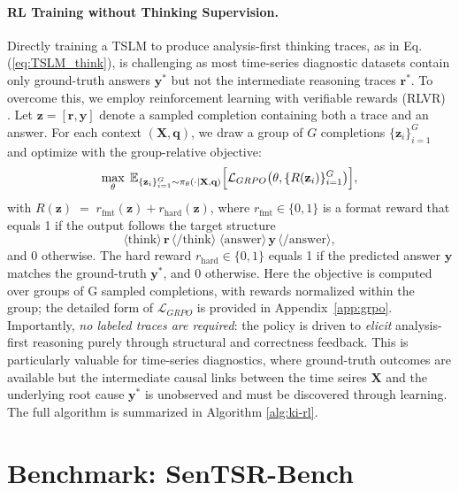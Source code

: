 \documentclass[twoside]{article}
\begin{document}
\paragraph{RL Training without Thinking Supervision.}
Directly training a TSLM to produce analysis-first thinking traces, as in Eq. (\ref{eq:TSLM_think}), is challenging as most time-series diagnostic datasets contain only ground-truth answers \(\mathbf{y}^*\) but not the intermediate reasoning traces \(\mathbf{r}^*\). To overcome this, we employ reinforcement learning with verifiable rewards (RLVR) \citep{guo2025deepseek}. Let $\mathbf{z}=[\mathbf{r},\mathbf{y}]$ denote a sampled completion containing both a trace and an answer. 
For each context $(\mathbf{X},\mathbf{q})$, we draw a group of $G$ completions $\{\mathbf{z}_i\}_{i=1}^G$ and optimize with the group-relative objective: 
\begin{align}
\label{eq:grpo_main}
\max_{\theta}\; \mathbb{E}_{\{\mathbf{z}_i\}_{i=1}^G \sim \pi_{\theta}(\cdot\mid \mathbf{X},\mathbf{q})}
\Bigl[\mathcal{L}_{GRPO}\bigl(\theta, \{R(\mathbf{z}_i)\}_{i=1}^G \bigr)\Bigr],
\end{align}
with $R(\mathbf{z}) \;=\; r_{\mathrm{fmt}}(\mathbf{z}) + r_{\mathrm{hard}}(\mathbf{z})$, where \(r_{\mathrm{fmt}}\in\{0,1\}\) is a format reward that equals 1 if the output follows the target structure  
\[
\langle\mathrm{think}\rangle\, \mathbf{r}\, \langle/\mathrm{think}\rangle \;
\langle\mathrm{answer}\rangle\, \mathbf{y}\, \langle/\mathrm{answer}\rangle,
\]  
and 0 otherwise. The hard reward \(r_{\mathrm{hard}}\in\{0,1\}\) equals 1 if the predicted answer \(\mathbf{y}\) matches the ground-truth \(\mathbf{y}^*\), and 0 otherwise. Here the objective is computed over groups of G sampled completions, with rewards normalized within the group; the detailed form of $\mathcal{L}_{GRPO}$ is provided in Appendix~\ref{app:grpo}. Importantly, \emph{no labeled traces are required}: the policy is driven to \emph{elicit} analysis-first reasoning purely through structural and correctness feedback. This is particularly valuable for time-series diagnostics, where ground-truth outcomes are available but the intermediate causal links between the time seires $\mathbf{X}$ and the underlying root cause $\mathbf{y}^*$ is unobserved and must be discovered through learning. The full algorithm is summarized in Algorithm \ref{alg:ki-rl}.

\section{Benchmark: SenTSR-Bench}
\end{document}
